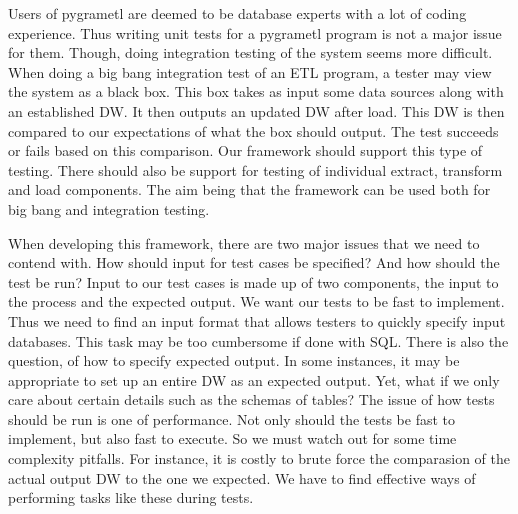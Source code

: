 Users of pygrametl are deemed to be database experts with a lot of coding experience. Thus writing unit tests for a pygrametl program is not a major issue for them. Though, doing integration testing of the system seems more difficult. When doing a big bang integration test of an ETL program, a tester may view the system as a black box. This box takes as input some data sources along with an established DW. It then outputs an updated DW after load. This DW is then compared to our expectations of what the box should output. The test succeeds or fails based on this comparison. Our framework should support this type of testing. There should also be support for testing of  individual extract, transform and load components. The aim being that the framework can be used both for big bang and integration testing.

When developing this framework, there are two major issues that we need to contend with. How should input for test cases be specified? And how should the test be run?  Input to our test cases is made up of two components, the input to the process and the expected output. We want our tests to be fast to implement. Thus we need to find an input format that allows testers to quickly specify input databases. This task may be too cumbersome if done with SQL. There is also the question, of how to specify expected output. In some instances, it may be appropriate to set up an entire DW as an expected output. Yet, what if we only care about certain details such as the schemas of tables? The issue of how tests should be run is one of performance. Not only should the tests be fast to implement, but also fast to execute. So we must watch out for some time complexity pitfalls. For instance, it is costly to brute force the comparasion of the actual output DW to the one we expected. We have to find effective ways of performing tasks like these during tests. 


